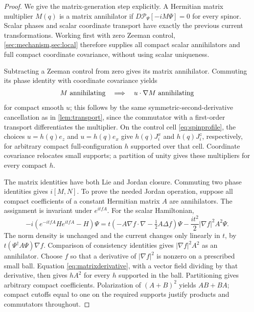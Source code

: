 \documentclass[11pt]{article}
\numberwithin{equation}{section}
\theoremstyle{definition}
\newcommand{\Pcal}{\mathcal P}
\begin{document}
\begin{proof}
We give the matrix-generation step explicitly. A Hermitian matrix multiplier \(M(q)\) is a matrix annihilator if \(D\Pcal_\Psi[-iM\Psi]=0\) for every spinor. Scalar phases and scalar coordinate transport have exactly the previous current transformations. Working first with zero Zeeman control, \cref{sec:mechanism,sec:local} therefore supplies all compact scalar annihilators and full compact coordinate covariance, without using scalar uniqueness.

Subtracting a Zeeman control from zero gives its matrix annihilator. Commuting its phase identity with coordinate covariance yields
\begin{equation}\label{eq:matrixderivative}
 M\ \hbox{annihilating}\quad\Longrightarrow\quad
 u\cdot\nabla M\ \hbox{annihilating}
\end{equation}
for compact smooth \(u\); this follows by the same symmetric-second-derivative cancellation as in \cref{lem:transport}, since the commutator with a first-order transport differentiates the multiplier. On the control cell \eqref{eq:spinprofile}, the choices \(u=h(q)e_z\) and \(u=h(q)e_x\) give \(h(q)J_i^x\) and \(h(q)J_i^z\), respectively, for arbitrary compact full-configuration \(h\) supported over that cell. Coordinate covariance relocates small supports; a partition of unity gives these multipliers for every compact \(h\).

The matrix identities have both Lie and Jordan closure. Commuting two phase identities gives \(i[M,N]\). To prove the needed Jordan operation, suppose all compact coefficients of a constant Hermitian matrix \(A\) are annihilators. The assignment is invariant under \(e^{itfA}\). For the scalar Hamiltonian,
\[
 -i(e^{-itfA}He^{itfA}-H)\Psi
 =t\left(-A\nabla f\cdot\nabla-\tfrac12A\Delta f\right)\Psi
       -\frac{it^2}{2}|\nabla f|^2 A^2\Psi.
\]
The norm density is unchanged and the current changes only linearly in \(t\), by
\(t(\Psi^\dagger A\Psi)\nabla f\). Comparison of consistency identities gives
\(|\nabla f|^2A^2\) as an annihilator. Choose \(f\) so that a derivative of \(|\nabla f|^2\) is nonzero on a prescribed small ball. Equation \eqref{eq:matrixderivative}, with a vector field dividing by that derivative, then gives \(hA^2\) for every \(h\) supported in the ball. Partitioning gives arbitrary compact coefficients. Polarization of \((A+B)^2\) yields \(AB+BA\); compact cutoffs equal to one on the required supports justify products and commutators throughout.


\end{proof}
\end{document}
